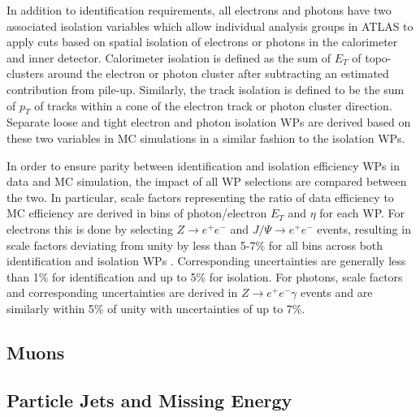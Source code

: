 In addition to identification requirements, all electrons and photons have two associated isolation variables which 
allow individual analysis groups in ATLAS to apply cuts based on spatial isolation of electrons or photons in the 
calorimeter and inner detector. Calorimeter isolation is defined as the sum of $E_T$ of topo-clusters around the 
electron or photon cluster after subtracting an estimated contribution from pile-up. Similarly, the track isolation 
is defined to be the sum of $p_T$ of tracks within a cone of the electron track or photon cluster direction. Separate 
loose and tight electron and photon isolation WPs are derived based on these two variables in MC simulations in a 
similar fashion to the isolation WPs. \par

In order to ensure parity between identification and isolation efficiency WPs in data and MC simulation, the impact 
of all WP selections are compared between the two. In particular, scale factors representing the ratio of data efficiency 
to MC efficiency are derived in bins of photon/electron $E_T$ and $\eta$ for each WP. For electrons this is done by 
selecting $Z \rightarrow e^+e^-$ and $J/\Psi \rightarrow e^+e^-$ events, resulting in scale factors deviating from unity 
by less than 5-7\% for all bins across both identification and isolation WPs \cite{atlas-electrons-photons-eff}. 
Corresponding uncertainties are generally less than 1\% for identification and up to 5\% for isolation. For photons, 
scale factors and corresponding uncertainties are derived in $Z \rightarrow e^+e^-\gamma$ events and are similarly within 
5\% of unity with uncertainties of up to 7\%. \par

\subsection{Muons}

\subsection{Particle Jets and Missing Energy}